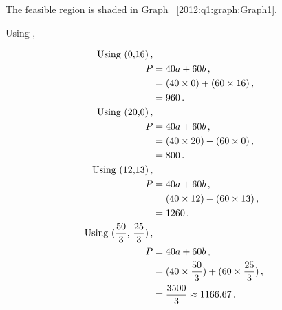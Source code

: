 \begin{subquestions}
\begin{subsubquestions}

\subsubquestion

The feasible region is shaded in Graph ~\ref{2012:q1:graph:Graph1}.

\end{subsubquestions}


\subquestion

\begin{subsubquestions}
	

\subsubquestion

Using ,

\begin{align}
	\text{Using (0,16)} \,, \nonumber \\
	P & = 40a + 60b \,, \nonumber \\
	  & = (40 \times 0) + (60 \times 16) \,, \nonumber \\
	  & = 960 \,. \\
	\text{Using (20,0)} \,, \nonumber \\
	P & = 40a + 60b \,, \nonumber \\
      & = (40 \times 20) + (60 \times 0) \,, \nonumber \\
	  & = 800 \,. \\		  
	\text{Using (12,13)} \,, \nonumber \\
	P & = 40a + 60b \,, \nonumber \\
	  & = (40 \times 12) + (60 \times 13) \,, \nonumber \\
	  & = 1260 \,. \label{2012:q1:eqn:Profit} \\
	\text{Using ($\frac{50}{3}$, $\frac{25}{3}$)} \,, \nonumber \\
	P & = 40a + 60b \,, \nonumber \\
	  & = (40 \times \frac{50}{3}) + (60 \times \frac{25}{3}) \,, \nonumber \\
	  & = \frac{3500}{3} \approx 1166.67 \,. 
\end{align}


\end{subsubquestions}
\end{subquestions}
